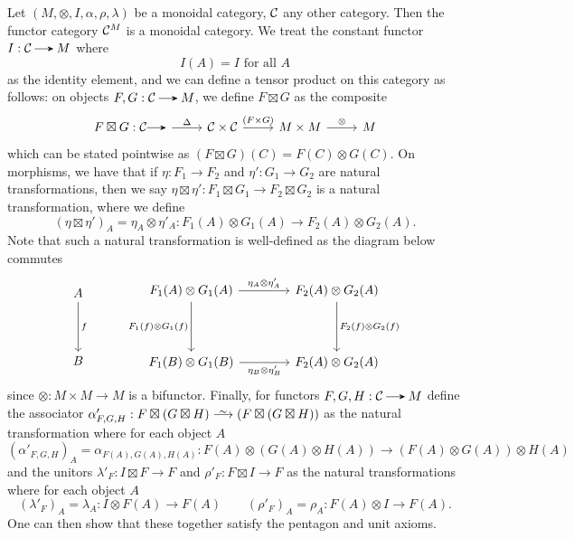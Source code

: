 \begin{example}\label{example_monoidal_functor_category}
    Let $(M, \otimes, I, \alpha, \rho, \lambda)$ be a monoidal category, $\mathcal{C}$ any other category. Then 
    the functor category
    $\mathcal{C}^M$ is a monoidal category. We treat the constant functor $I: \cc \to M$ where 
    \[
        I(A) = I \text{ for all } A
    \]
    as the identity element, and we can define a tensor product on this 
    category as follows: on objects $F, G: \cc \to M$, we define $F\boxtimes G$ 
    as the composite
    \[
        \begin{tikzcd}
            F \boxtimes G: \cc \to 
            \arrow[r, "\Delta"]
            &
            \cc \times \cc 
            \arrow[r, "(F \times G)"]
            &
            M \times M 
            \arrow[r, "\otimes"]
            &
            M
        \end{tikzcd}
    \]
    which can be stated pointwise as $(F\boxtimes G)(C) = F(C)\otimes G(C)$. On morphisms, 
    we have that if $\eta: F_1 \to F_2$ and $\eta': G_1 \to G_2$ are natural 
    transformations, then we say $\eta \boxtimes \eta': F_1\boxtimes G_1 \to F_2 \boxtimes G_2$ 
    is a natural transformation, where we define 
    \[
        (\eta \boxtimes \eta')_A = \eta_A \otimes \eta'_A: F_1(A)\otimes G_1(A) \to F_2(A)\otimes G_2(A).
    \]
    Note that such a natural transformation is well-defined 
    as the diagram below commutes
    \[
        \begin{tikzcd}[column sep = 1.4cm, row sep = 1.4cm]
            A \arrow[d, "f"]
            \\
            B
        \end{tikzcd}
        \hspace{1cm}
        \begin{tikzcd}[column sep = 1.4cm, row sep = 1.4cm]
            F_1(A)\otimes G_1(A)
            \arrow[r, "\eta_A\otimes \eta_A'"]
            \arrow[d, swap, "F_1(f)\otimes G_1(f)"]
            &
            F_2(A)\otimes G_2(A)
            \arrow[d, "F_2(f)\otimes G_2(f)"]
            \\
            F_1(B)\otimes G_1(B)
            \arrow[r, swap, "\eta_B\otimes \eta_B'"]
            &
            F_2(A)\otimes G_2(A)
        \end{tikzcd}
    \]
    since $\otimes: M \times M \to M$ is a bifunctor.
    Finally, for functors $F, G, H: \cc \to M$ define the associator 
    $\alpha'_{F, G, H}: F\boxtimes(G\boxtimes H) \isomarrow (F\boxtimes (G \boxtimes H))$ 
    as the natural transformation where for each object $A$
    \[
        (\alpha'_{F, G, H})_A = \alpha_{F(A), G(A), H(A)}: F(A)\otimes (G(A)\otimes H(A))
        \to (F(A)\otimes G(A))\otimes H(A)
    \]
    and the unitors $\lambda'_F: I\boxtimes F \to F$ and $\rho'_F: F \boxtimes I \to F$ 
    as the natural transformations where for each object $A$ 
    \[
        (\lambda'_F)_A  = \lambda_A: I \otimes F(A) \to F(A)
        \qquad 
        (\rho'_F)_A = \rho_A: F(A)\otimes I \to F(A).
    \]
    One can then show that these together satisfy the pentagon and unit axioms. 
\end{example}


